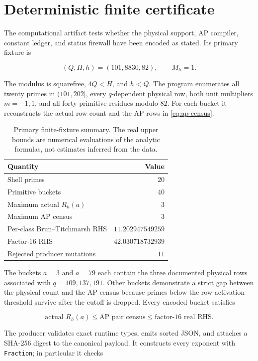 \section{Deterministic finite certificate}
\label{sec:certificate}

The computational artifact tests whether the physical support, AP compiler,
constant ledger, and status firewall have been encoded as stated.  Its primary
fixture is

\begin{equation}
 (Q,H,h)=(101,8830,82),\qquad M_h=1.
 \label{eq:fixture}
\end{equation}

The modulus is squarefree, $4Q<H$, and $h<Q$.  The program enumerates all
twenty primes in $(101,202]$, every $q$-dependent physical row, both unit
multipliers $m=-1,1$, and all forty primitive residues modulo $82$.  For
each bucket it reconstructs the actual row count and the AP rows in
\eqref{eq:ap-census}.

\begin{table}[ht]
\centering
\small
\caption{Primary finite-fixture summary.  The real upper bounds are numerical
evaluations of the analytic formulas, not estimates inferred from the data.}
\label{tab:fixture}
\begin{tabular}{@{}lr@{}}
\toprule
Quantity & Value \\
\midrule
Shell primes & $20$ \\
Primitive buckets & $40$ \\
Maximum actual $R_h(a)$ & $3$ \\
Maximum AP census & $3$ \\
Per-class Brun--Titchmarsh RHS & $11.202947549259$ \\
Factor-$16$ RHS & $42.030718732939$ \\
Rejected producer mutations & $11$ \\
\bottomrule
\end{tabular}
\end{table}

The buckets $a=3$ and $a=79$ each contain the three documented physical
rows associated with $q=109,137,191$.  Other buckets demonstrate a strict
gap between the physical count and the AP census because primes below the
row-activation threshold survive after the cutoff is dropped.  Every encoded
bucket satisfies

\[
 \text{actual }R_h(a)
 \leq\text{AP pair census}
 \leq\text{factor-16 real RHS}.
\]

The producer validates exact runtime types, emits sorted JSON, and attaches a
SHA-256 digest to the canonical payload.  It constructs every exponent with
\texttt{Fraction}; in particular it checks

